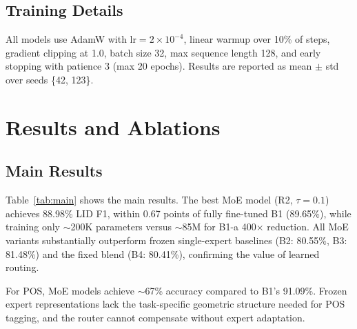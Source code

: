 \documentclass[conference]{IEEEtran}
\begin{document}
\subsection{Training Details}

All models use AdamW with $\text{lr}=2\times10^{-4}$, linear warmup over 10\% of steps, gradient clipping at 1.0, batch size 32, max sequence length 128, and early stopping with patience 3 (max 20 epochs). Results are reported as mean $\pm$ std over seeds \{42, 123\}.

\section{Results and Ablations}

\subsection{Main Results}

Table~\ref{tab:main} shows the main results. The best MoE model (R2, $\tau{=}0.1$) achieves 88.98\% LID F1, within 0.67 points of fully fine-tuned B1 (89.65\%), while training only $\sim$200K parameters versus $\sim$85M for B1-a 400$\times$ reduction. All MoE variants substantially outperform frozen single-expert baselines (B2: 80.55\%, B3: 81.48\%) and the fixed blend (B4: 80.41\%), confirming the value of learned routing.

For POS, MoE models achieve $\sim$67\% accuracy compared to B1's 91.09\%. Frozen expert representations lack the task-specific geometric structure needed for POS tagging, and the router cannot compensate without expert adaptation.
\end{document}
